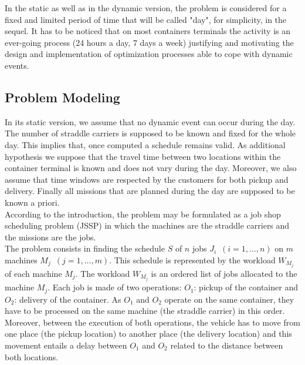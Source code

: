 \documentclass[a4paper,10pt]{article}
\begin{document}

In the static as well as in the dynamic version, the problem is considered for a fixed and limited period of time that will be called "day", for simplicity, in the sequel. It has to be noticed that on most containers terminals the activity is an ever-going process (24 hours a day, 7 days a week) justifying and motivating the design and implementation of optimization processes able to cope with dynamic events. 

\subsection{Problem Modeling}

In its static version, we assume that no dynamic event can occur during the day. The number of straddle carriers is supposed to be known and fixed for the whole day. This implies that, once computed a schedule remains valid. As additional hypothesis we suppose that the travel time between two locations within the container terminal is known and does not vary during the day. Moreover, we also assume that time windows are respected by the customers for both pickup and delivery. Finally all missions that are planned during the day are supposed to be known a priori. \\


According to the introduction, the problem may be formulated as a job shop scheduling problem (JSSP) in which the machines are the straddle carriers and the missions are the jobs. \\

The problem consists in finding the schedule $S$ of $n$ jobs $J_i$~$(i=1,\ldots,n)$ on $m$ machines $M_j$~$(j=1,\ldots,m)$. This schedule is represented by the workload $W_{M_j}$ of each machine $M_j$. The workload $W_{M_j}$ is an ordered list of jobs allocated to the machine $M_j$. Each job is made of two operations: $O_1$: pickup of the container and $O_2$: delivery of the container. As $O_1$ and $O_2$ operate on the same container, they have to be processed on the same machine (the straddle carrier) in this order. Moreover, between the execution of both operations, the vehicle has to move from one place (the pickup location) to another place (the delivery location) and this movement entails a delay between $O_1$ and $O_2$ related to the distance between both locations.
\end{document}
